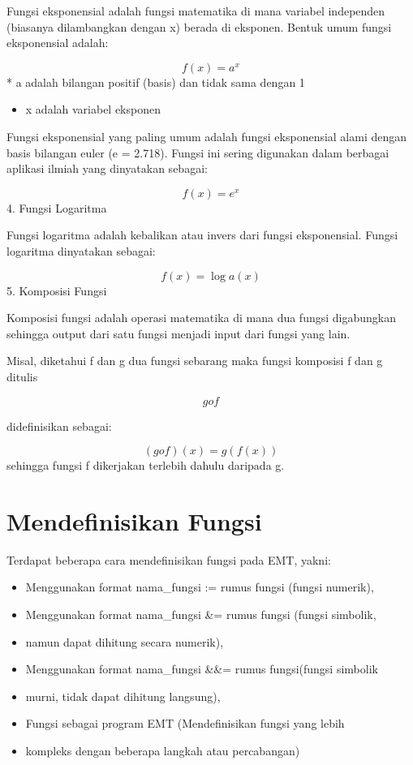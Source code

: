 \documentclass[
]{book}
\providecommand{\tightlist}{%
  \setlength{\itemsep}{0pt}\setlength{\parskip}{0pt}}
\begin{document}
Fungsi eksponensial adalah fungsi matematika di mana variabel independen (biasanya dilambangkan dengan x) berada di eksponen. Bentuk umum fungsi eksponensial adalah:

\[f(x)=a^x\]* a adalah bilangan positif (basis) dan tidak sama dengan 1

\begin{itemize}
\tightlist
\item
  x adalah variabel eksponen
\end{itemize}

Fungsi eksponensial yang paling umum adalah fungsi eksponensial alami dengan basis bilangan euler (e = 2.718). Fungsi ini sering digunakan dalam berbagai aplikasi ilmiah yang dinyatakan sebagai:

\[f(x)=e^x\]4. Fungsi Logaritma

Fungsi logaritma adalah kebalikan atau invers dari fungsi eksponensial. Fungsi logaritma dinyatakan sebagai:

\[f(x)= \log a(x)\]5. Komposisi Fungsi

Komposisi fungsi adalah operasi matematika di mana dua fungsi digabungkan sehingga output dari satu fungsi menjadi input dari fungsi yang lain.

Misal, diketahui f dan g dua fungsi sebarang maka fungsi komposisi f dan g ditulis

\[g o f\]

didefinisikan sebagai:

\[(g o f)(x) = g(f(x))\]sehingga fungsi f dikerjakan terlebih dahulu daripada g.

\section{Mendefinisikan Fungsi}\label{mendefinisikan-fungsi}

Terdapat beberapa cara mendefinisikan fungsi pada EMT, yakni:

\begin{itemize}
\item
  Menggunakan format nama\_fungsi := rumus fungsi (fungsi numerik),
\item
  Menggunakan format nama\_fungsi \&= rumus fungsi (fungsi simbolik,
\item
  namun dapat dihitung secara numerik),
\item
  Menggunakan format nama\_fungsi \&\&= rumus fungsi(fungsi simbolik
\item
  murni, tidak dapat dihitung langsung),
\item
  Fungsi sebagai program EMT (Mendefinisikan fungsi yang lebih
\item
  kompleks dengan beberapa langkah atau percabangan)
\end{itemize}
\end{document}
